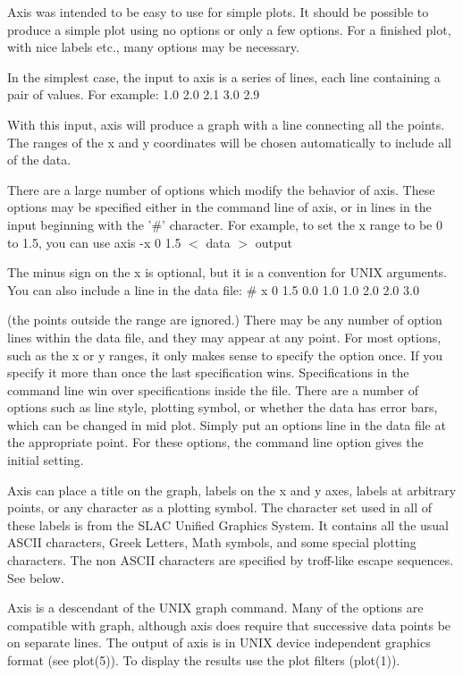 Axis was intended to be easy to use for simple plots.  It should be
possible to produce a simple plot using no options or only a few
options.  For a finished plot, with nice labels etc., many options
may be necessary.

In the simplest case, the input to axis is a series of lines, each line
containing a pair of values. For example:
   1.0
2.0   2.1
3.0   2.9
\displayend

\noindent
With this input, axis will produce a graph with a line connecting all
the points.  The ranges of the x and y coordinates will be chosen
automatically to include all of the data.

There are a large number of options which modify the behavior of
axis.  These options may be specified either in the command line
of axis, or in lines in the input beginning with the '\#' character.
For example, to set the x range to be 0 to 1.5, you can use
\displaybegin
axis  -x  0  1.5  $<$  data  $>$  output
\displayend

\noindent
The minus sign on the x is optional, but it is a convention for UNIX arguments.
You can also include a line in the data file:
\displaybegin
\# x  0  1.5
0.0   1.0
1.0   2.0
2.0   3.0
\displayend

\noindent
(the points outside the range are ignored.)
There may be any number of option lines within the data file, and
they may appear at any point.  For most options, such as the x or y
ranges, it only makes sense to specify the option once.  If you
specify it more than once the last specification wins.  Specifications
in the command line win over specifications inside the file.
There are a number of options such as line style, plotting symbol,
or whether the data has error bars, which can be changed in mid plot.
Simply put an options line in the data file at the appropriate point.
For these options, the command line option gives the initial setting.

Axis can place a title on the graph, labels on the x and y axes, labels
at arbitrary points, or any character as a plotting symbol.  The character
set used in all of these labels is from the SLAC Unified Graphics
System.  It contains all the usual ASCII characters, Greek Letters,
Math symbols, and some special plotting characters.  The non ASCII
characters are specified by troff-like escape sequences. See below.

Axis is a descendant of the UNIX graph command.  Many of the options
are compatible with graph, although axis does require that
successive data points be on separate lines.  The output of axis
is in UNIX device independent graphics format (see plot(5)).
To display the results use the plot filters (plot(1)).

